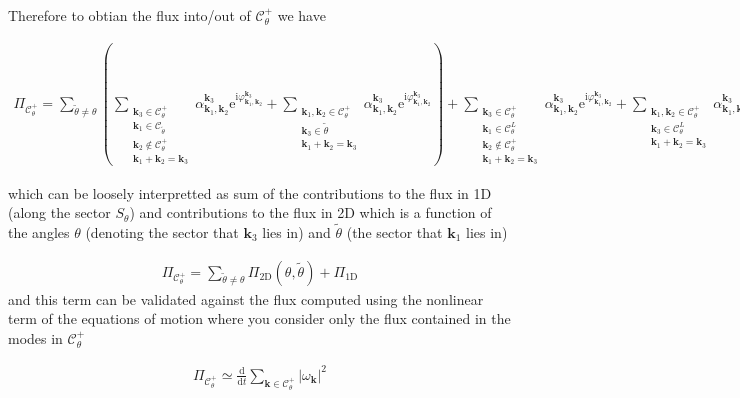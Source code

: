 \documentclass[9pt]{article}
\newcommand{\der}[2]{\frac{\mathrm{d}#1}{\mathrm{d}#2}}          	 %
\newcommand{\triad}[3]{\varphi_{#1, #2}^{#3}}                     %
\newcommand{\ii}{\mathrm{i}}      								  %
\newcommand{\e}{\mathrm{e}}      								  %
\newcommand{\alphakkk}[3]{\alpha_{\bfkn{#1}, \bfkn{#2}}^{\bfkn{#3}}}
\newcommand{\bfk}{\mathbf{k}}								%
\newcommand{\bfkn}[1]{\mathbf{k}_{#1}}								%
\begin{document}
Therefore to obtian the flux into/out of $\mathcal{C}_{\theta}^{+}$ we have

\begin{align}
	\Pi_{\mathcal{C}_{\theta}^{+}} = \sum_{\tilde{\theta} \neq \theta} \left( \sum_{\substack{\bfkn{3} \in \mathcal{C}_{\theta}^{+} \\ \bfkn{1} \in \mathcal{C}_{\tilde{\theta}} \\ \bfkn{2} \notin \mathcal{C}_{\theta}^{+} \\ \bfkn{1} + \bfkn{2} = \bfkn{3}}} \alphakkk{{1}}{2}{3}\e^{\ii \triad{\bfkn{1}}{\bfkn{2}}{\bfkn{3}}} + \sum_{\substack{\bfkn{1}, \bfkn{2} \in \mathcal{C}_{\theta}^{+} \\ \bfkn{3} \in \mathcal{\tilde{\theta}} \\ \bfkn{1} + \bfkn{2} = \bfkn{3}}} \alphakkk{{1}}{2}{3}\e^{\ii \triad{\bfkn{1}}{\bfkn{2}}{\bfkn{3}}} \right) +  \sum_{\substack{\bfkn{3} \in \mathcal{C}_{\theta}^{+} \\ \bfkn{1} \in \mathcal{C}_{\theta}^{L} \\ \bfkn{2} \notin \mathcal{C}_{\theta}^{+} \\ \bfkn{1} + \bfkn{2} = \bfkn{3}}} \alphakkk{{1}}{2}{3}\e^{\ii \triad{\bfkn{1}}{\bfkn{2}}{\bfkn{3}}} + \sum_{\substack{\bfkn{1}, \bfkn{2} \in \mathcal{C}_{\theta}^{+} \\ \bfkn{3} \in \mathcal{C}_{\theta}^{L} \\ \bfkn{1} + \bfkn{2} = \bfkn{3}}} \alphakkk{{1}}{2}{3}\e^{\ii \triad{\bfkn{1}}{\bfkn{2}}{\bfkn{3}}}
\end{align}


which can be loosely interpretted as sum of the contributions to the flux in 1D (along the sector $S_\theta$) and contributions to the flux in 2D which is a function of the angles $\theta$ (denoting the sector that $\bfkn{3}$ lies in) and $\tilde{\theta}$ (the sector that $\bfkn{1}$ lies in)
	
\begin{align}
	\Pi_{\mathcal{C}_{\theta}^{+}} = \sum_{\tilde{\theta} \neq \theta} \Pi_{\text{2D}}(\theta, \tilde{\theta}) + \Pi_{\text{1D}}
\end{align}
and this term can be validated against the flux computed using the nonlinear term of the equations of motion where you consider only the flux contained in the modes in $\mathcal{C}_{\theta}^{+}$

\begin{align}
	\Pi_{\mathcal{C}_{\theta}^{+}} \simeq \der{}{t} \sum_{\bfk \in \mathcal{C}_{\theta}^{+}} |\omega_{\bfk}|^2
\end{align}
\end{document}
